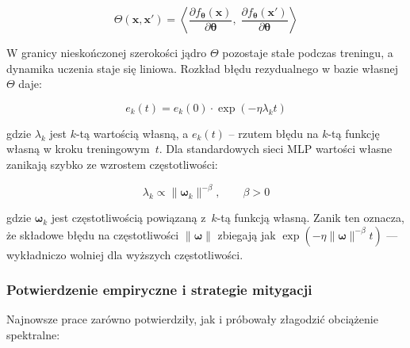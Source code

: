 \begin{equation}
    \Theta(\mathbf{x}, \mathbf{x}')
    = \left\langle
        \frac{\partial f_{\boldsymbol{\theta}}(\mathbf{x})}
             {\partial \boldsymbol{\theta}},\;
        \frac{\partial f_{\boldsymbol{\theta}}(\mathbf{x}')}
             {\partial \boldsymbol{\theta}}
      \right\rangle
\end{equation}

W granicy nieskończonej szerokości jądro $\Theta$ pozostaje stałe podczas
treningu, a dynamika uczenia staje się liniowa.  Rozkład błędu rezydualnego
w bazie własnej $\Theta$ daje:

\begin{equation}
    e_k(t) = e_k(0) \cdot \exp(-\eta \lambda_k t)
    \label{eq:ntk_convergence}
\end{equation}

gdzie $\lambda_k$ jest $k$-tą wartością własną, a $e_k(t)$ -- rzutem błędu na
$k$-tą funkcję własną w kroku treningowym~$t$.  Dla standardowych sieci MLP
wartości własne zanikają szybko ze wzrostem częstotliwości:

\begin{equation}
    \lambda_k \propto \|\boldsymbol{\omega}_k\|^{-\beta},
    \qquad \beta > 0
    \label{eq:eigenvalue_decay}
\end{equation}

gdzie $\boldsymbol{\omega}_k$ jest częstotliwością powiązaną z~$k$-tą funkcją
własną.  Zanik ten oznacza, że składowe błędu na częstotliwości
$\|\boldsymbol{\omega}\|$ zbiegają jak
$\exp(-\eta \|\boldsymbol{\omega}\|^{-\beta} t)$ --- wykładniczo wolniej
dla wyższych częstotliwości.

\subsubsection{Potwierdzenie empiryczne i strategie mitygacji}

Najnowsze prace zarówno potwierdziły, jak i próbowały złagodzić obciążenie
spektralne:

